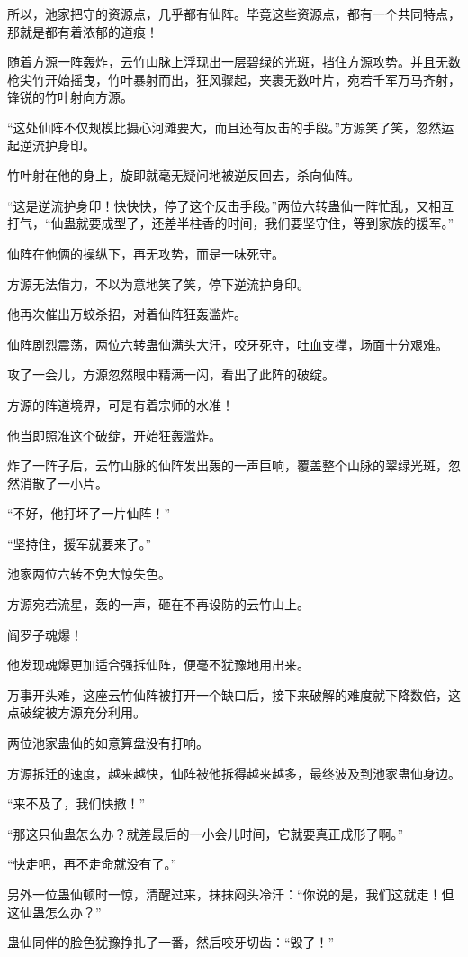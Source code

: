 \begin{this_body}
所以，池家把守的资源点，几乎都有仙阵。毕竟这些资源点，都有一个共同特点，那就是都有着浓郁的道痕！

随着方源一阵轰炸，云竹山脉上浮现出一层碧绿的光斑，挡住方源攻势。并且无数枪尖竹开始摇曳，竹叶暴射而出，狂风骤起，夹裹无数叶片，宛若千军万马齐射，锋锐的竹叶射向方源。

“这处仙阵不仅规模比摄心河滩要大，而且还有反击的手段。”方源笑了笑，忽然运起逆流护身印。

竹叶射在他的身上，旋即就毫无疑问地被逆反回去，杀向仙阵。

“这是逆流护身印！快快快，停了这个反击手段。”两位六转蛊仙一阵忙乱，又相互打气，“仙蛊就要成型了，还差半柱香的时间，我们要坚守住，等到家族的援军。”

仙阵在他俩的操纵下，再无攻势，而是一味死守。

方源无法借力，不以为意地笑了笑，停下逆流护身印。

他再次催出万蛟杀招，对着仙阵狂轰滥炸。

仙阵剧烈震荡，两位六转蛊仙满头大汗，咬牙死守，吐血支撑，场面十分艰难。

攻了一会儿，方源忽然眼中精满一闪，看出了此阵的破绽。

方源的阵道境界，可是有着宗师的水准！

他当即照准这个破绽，开始狂轰滥炸。

炸了一阵子后，云竹山脉的仙阵发出轰的一声巨响，覆盖整个山脉的翠绿光斑，忽然消散了一小片。

“不好，他打坏了一片仙阵！”

“坚持住，援军就要来了。”

池家两位六转不免大惊失色。

方源宛若流星，轰的一声，砸在不再设防的云竹山上。

阎罗子魂爆！

他发现魂爆更加适合强拆仙阵，便毫不犹豫地用出来。

万事开头难，这座云竹仙阵被打开一个缺口后，接下来破解的难度就下降数倍，这点破绽被方源充分利用。

两位池家蛊仙的如意算盘没有打响。

方源拆迁的速度，越来越快，仙阵被他拆得越来越多，最终波及到池家蛊仙身边。

“来不及了，我们快撤！”

“那这只仙蛊怎么办？就差最后的一小会儿时间，它就要真正成形了啊。”

“快走吧，再不走命就没有了。”

另外一位蛊仙顿时一惊，清醒过来，抹抹闷头冷汗：“你说的是，我们这就走！但这仙蛊怎么办？”

蛊仙同伴的脸色犹豫挣扎了一番，然后咬牙切齿：“毁了！”

\end{this_body}

